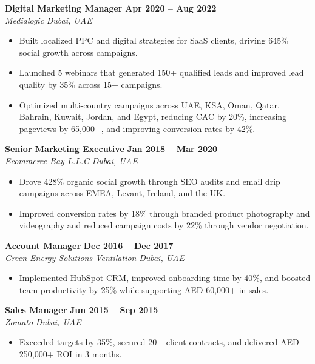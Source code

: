 \documentclass[10.5pt,a4paper]{article}
\begin{document}
\noindent\textbf{Digital Marketing Manager} \hfill \textbf{Apr 2020 -- Aug 2022}\\
\textit{Medialogic} \hfill \textit{Dubai, UAE}
\begin{itemize}[leftmargin=*,nosep,topsep=2pt]
  \item Built localized PPC and digital strategies for SaaS clients, driving 645\% social growth across campaigns.
  \item Launched 5 webinars that generated 150+ qualified leads and improved lead quality by 35\% across 15+ campaigns.
  \item Optimized multi-country campaigns across UAE, KSA, Oman, Qatar, Bahrain, Kuwait, Jordan, and Egypt, reducing CAC by 20\%, increasing pageviews by 65,000+, and improving conversion rates by 42\%.
\end{itemize}
\vspace{4pt}

\noindent\textbf{Senior Marketing Executive} \hfill \textbf{Jan 2018 -- Mar 2020}\\
\textit{Ecommerce Bay L.L.C} \hfill \textit{Dubai, UAE}
\begin{itemize}[leftmargin=*,nosep,topsep=2pt]
  \item Drove 428\% organic social growth through SEO audits and email drip campaigns across EMEA, Levant, Ireland, and the UK.
  \item Improved conversion rates by 18\% through branded product photography and videography and reduced campaign costs by 22\% through vendor negotiation.
\end{itemize}
\vspace{4pt}

\noindent\textbf{Account Manager} \hfill \textbf{Dec 2016 -- Dec 2017}\\
\textit{Green Energy Solutions Ventilation} \hfill \textit{Dubai, UAE}
\begin{itemize}[leftmargin=*,nosep,topsep=2pt]
  \item Implemented HubSpot CRM, improved onboarding time by 40\%, and boosted team productivity by 25\% while supporting AED 60,000+ in sales.
\end{itemize}
\vspace{4pt}

\noindent\textbf{Sales Manager} \hfill \textbf{Jun 2015 -- Sep 2015}\\
\textit{Zomato} \hfill \textit{Dubai, UAE}
\begin{itemize}[leftmargin=*,nosep,topsep=2pt]
  \item Exceeded targets by 35\%, secured 20+ client contracts, and delivered AED 250,000+ ROI in 3 months.
\end{itemize}
\vspace{4pt}
\end{document}

